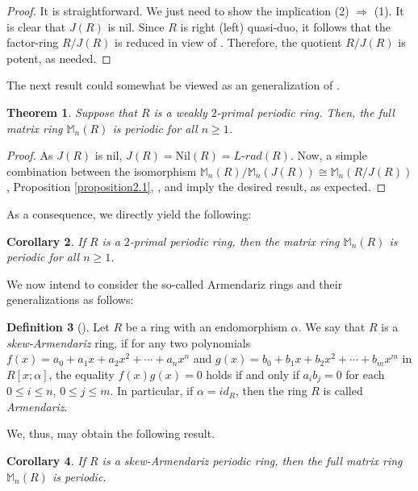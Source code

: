 \documentclass[12pt]{amsart}
\newtheorem{thm}{Theorem}[section]
\newtheorem{cor}[thm]{Corollary}
\theoremstyle{definition}
\newtheorem{defn}[thm]{Definition}
\theoremstyle{remark}
\numberwithin{equation}{section}
\begin{document}
\begin{proof}
It is straightforward. We just need to show the implication (2) $\Rightarrow$ (1). It is clear that $J(R)$ is nil. Since $R$ is right (left) quasi-duo, it follows that the factor-ring $R/J(R)$ is reduced in view of \cite[Corollary 2.4]{yu1995quasi}. Therefore, the quotient $R/J(R)$ is potent, as needed.
\end{proof}

The next result could somewhat be viewed as an generalization of \cite[Theorem 2.6]{DGL}.

\begin{thm}\label{theorem2.3}
Suppose that $R$ is a weakly $2$-primal periodic ring. Then, the full matrix ring $\mathbb{M}_n(R)$ is periodic for all $n \geq 1$.
\end{thm}

\begin{proof}
As $J(R)$ is nil, $J(R)=\mathrm{Nil}(R)=L\text{-}rad(R)$. Now, a simple combination between the isomorphism $\mathbb{M}_n(R)/\mathbb{M}_n(J(R)) \cong \mathbb{M}_n(R/J(R))$, Proposition \ref{proposition2.1}, \cite[Corollary 2.22]{BCL}, \cite[Proposition 1.1]{BM} and \cite[Corollary 3.6] {CD} imply the desired result, as expected.
\end{proof}

As a consequence, we directly yield the following:

\begin{cor}\label{corollary2.4}
If $R$ is a $2$-primal periodic ring, then the matrix ring $\mathbb{M}_n(R)$ is periodic for all $n\geq 1$.
\end{cor}

We now intend to consider the so-called Armendariz rings and their generalizations as follows:

\begin{defn}[{\cite[Definition 2.1]{Nasr-Isfahani}}]
Let $R$ be a ring with an endomorphism $\alpha$. We say that $R$ is a \textit{skew-Armendariz} ring, if for any two polynomials $f(x)=a_0+a_1x+a_2x^2+ \cdots +a_nx^n$ and $g(x)=b_0+b_1x+b_2x^2+ \cdots +b_mx^m$ in $R[x;\alpha]$, the equality $f(x)g(x)=0$ holds if and only if $a_ib_j=0$ for each $0 \leq i \leq n$, $0 \leq j \leq m$. In particular, if $\alpha=id_R$, then the ring $R$ is called \textit{Armendariz}.
\end{defn}

We, thus, may obtain the following result.

\begin{cor}\label{corollary2.4-1}
If $R$ is a \textit{skew-Armendariz} periodic ring, then the full matrix ring $\mathbb{M}_n(R)$ is periodic.
\end{cor}
\end{document}
